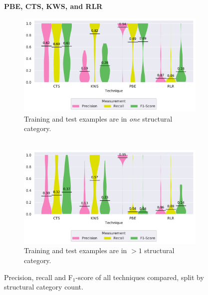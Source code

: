 \begin{figure}
\centering
    \textbf{PBE, CTS, KWS, and RLR}\par\medskip
\begin{subfigure}[b]{\columnwidth}
		\centering
				\includegraphics[width=\columnwidth,
				clip]{img/big-study/recall-precision-singlecategory-all.pdf}
		\caption{Training and test examples are in \emph{one}
		structural category.\\ \,}
		\label{fig:recall-precision-singlecategory-all}
\end{subfigure}\hspace{\fill}
\begin{subfigure}[b]{\columnwidth}
		\centering
				\centering
		\includegraphics[width=\columnwidth,
		clip]{img/big-study/recall-precision-multicategory-all.pdf}
		\caption{Training and test examples are in $>1$ structural
		category.}
		\label{fig:recall-precision-multicategory-all}
\end{subfigure}
\caption{Precision, recall and F$_{1}$-score of all
techniques compared, split by structural category count.}
\end{figure}

